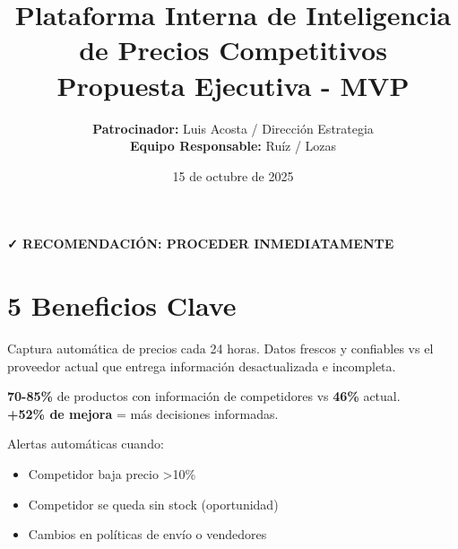 \documentclass[12pt,a4paper]{article}
\title{
    \LARGE\textbf{Plataforma Interna de Inteligencia\\de Precios Competitivos}\\
    \vspace{0.5cm}
    \large Propuesta Ejecutiva - MVP
}
\author{
    \textbf{Patrocinador:} Luis Acosta / Dirección Estrategia\\
    \textbf{Equipo Responsable:} Ruíz / Lozas
}
\date{15 de octubre de 2025}
\begin{document}
\maketitle
\thispagestyle{empty}

\vspace{1cm}
\begin{center}
    \Large
    \textcolor{successgreen}{\textbf{✓ RECOMENDACIÓN: PROCEDER INMEDIATAMENTE}}
\end{center}

\vspace{0.5cm}
\begin{center}
\end{center}

\newpage
\tableofcontents
\newpage

\section*{5 Beneficios Clave}

\begin{tcolorbox}[colback=successgreen!10, colframe=successgreen, title=\textbf{1. Control Total de Información Competitiva}]
Captura automática de precios cada 24 horas. Datos frescos y confiables vs el proveedor actual que entrega información desactualizada e incompleta.
\end{tcolorbox}

\begin{tcolorbox}[colback=primaryblue!10, colframe=primaryblue, title=\textbf{2. Mejora Dramática en Cobertura}]
\textbf{70-85\%} de productos con información de competidores vs \textbf{46\%} actual.\\
\textcolor{successgreen}{\textbf{+52\% de mejora}} = más decisiones informadas.
\end{tcolorbox}

\begin{tcolorbox}[colback=successgreen!10, colframe=successgreen, title=\textbf{3. Reacción en Tiempo Real}]
Alertas automáticas cuando:
\begin{itemize}[leftmargin=*]
    \item Competidor baja precio >10\%
    \item Competidor se queda sin stock (oportunidad)
    \item Cambios en políticas de envío o vendedores
\end{itemize}
\end{tcolorbox}
\end{document}
